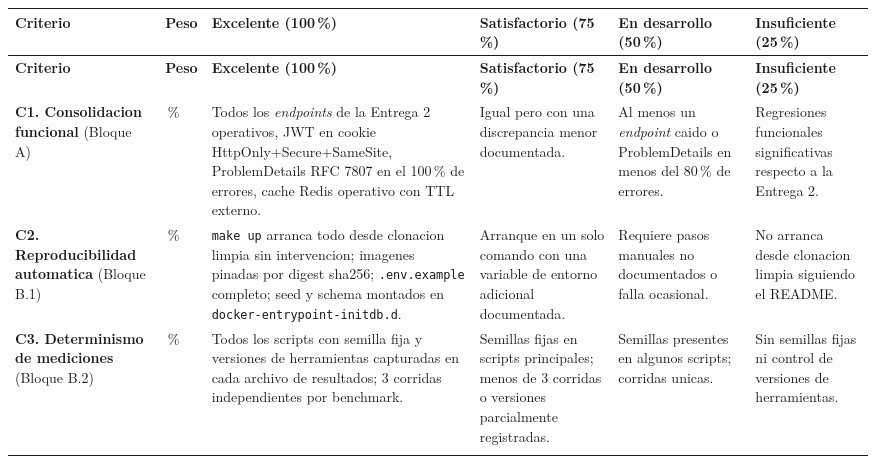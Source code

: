 \documentclass[11pt,a4paper]{article}
\begin{document}
{
\footnotesize
\renewcommand{\arraystretch}{1.3}
\begin{longtable}{|L{3.0cm}|C{0.9cm}|L{2.5cm}|L{2.5cm}|L{2.5cm}|L{2.3cm}|}
\hline
{}
{\color{white}\textbf{Criterio}} &
{\color{white}\textbf{Peso}} &
{\color{white}\textbf{Excelente (100\,\%)}} &
{\color{white}\textbf{Satisfactorio (75\,\%)}} &
{\color{white}\textbf{En desarrollo (50\,\%)}} &
{\color{white}\textbf{Insuficiente (25\,\%)}} \\
\hline
\endfirsthead

\hline
{}
{\color{white}\textbf{Criterio}} &
{\color{white}\textbf{Peso}} &
{\color{white}\textbf{Excelente (100\,\%)}} &
{\color{white}\textbf{Satisfactorio (75\,\%)}} &
{\color{white}\textbf{En desarrollo (50\,\%)}} &
{\color{white}\textbf{Insuficiente (25\,\%)}} \\
\hline
\endhead

\textbf{C1. Consolidacion funcional} (Bloque A) &
\,\% &
Todos los \emph{endpoints} de la Entrega 2 operativos, JWT en cookie HttpOnly+Secure+SameSite, ProblemDetails RFC 7807 en el 100\,\% de errores, cache Redis operativo con TTL externo. &
Igual pero con una discrepancia menor documentada. &
Al menos un \emph{endpoint} caido o ProblemDetails en menos del 80\,\% de errores. &
Regresiones funcionales significativas respecto a la Entrega 2. \\

\textbf{C2. Reproducibilidad automatica} (Bloque B.1) &
\,\% &
\texttt{make up} arranca todo desde clonacion limpia sin intervencion; imagenes pinadas por digest sha256; \texttt{.env.example} completo; seed y schema montados en \texttt{docker-entrypoint-initdb.d}. &
Arranque en un solo comando con una variable de entorno adicional documentada. &
Requiere pasos manuales no documentados o falla ocasional. &
No arranca desde clonacion limpia siguiendo el README. \\

\textbf{C3. Determinismo de mediciones} (Bloque B.2) &
\,\% &
Todos los scripts con semilla fija y versiones de herramientas capturadas en cada archivo de resultados; 3 corridas independientes por benchmark. &
Semillas fijas en scripts principales; menos de 3 corridas o versiones parcialmente registradas. &
Semillas presentes en algunos scripts; corridas unicas. &
Sin semillas fijas ni control de versiones de herramientas. \\


\end{longtable}}
\end{document}
